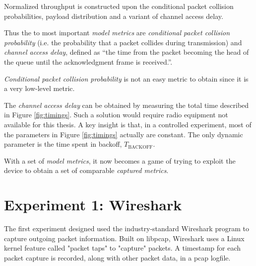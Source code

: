 Normalized throughput is constructed upon the conditional packet collision
probabilities, payload distribution and a variant of channel access delay.

Thus the to most important \emph{model metrics} are \emph{conditional packet
collision probability} (i.e. the probability that a packet collides during
transmission) and \emph{channel access delay}, defined as ``the time from the
packet becoming the head of the queue until the acknowledgment frame is
received.''.

\emph{Conditional packet collision probability} is not an easy metric to
obtain since it is a very low-level metric.

The \emph{channel access delay} can be obtained by measuring the total time
described in Figure \ref{fig:timings}. Such a solution would require radio
equipment not available for this thesis. A key insight is that, in a
controlled experiment, most of the parameters in Figure \ref{fig:timings}
actually are constant. The only dynamic parameter is the time spent in
backoff, $T_{\text{BACKOFF}}$.

With a set of \emph{model metrics}, it now becomes a game of trying to exploit
the device to obtain a set of comparable \emph{captured metrics}.


\section{Experiment 1: Wireshark}


The first experiment designed used the industry-standard Wireshark program to
capture outgoing packet information. Built on libpcap, Wireshark uses a Linux
kernel feature called "packet taps" to "capture" packets. A timestamp for each
packet capture is recorded, along with other packet data, in a pcap logfile.

